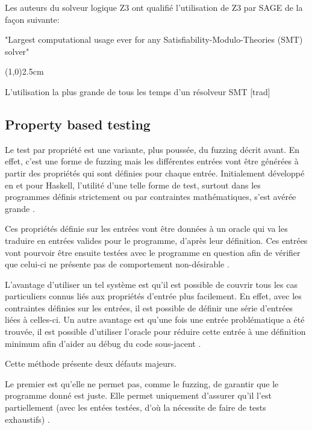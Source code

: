 \documentclass[a4paper]{report}
\begin{document}
Les auteurs du solveur logique Z3 ont qualifié l'utilisation de Z3 par SAGE de la façon suivante:
\begin{center}
"Largest computational usage ever for any Satisfiability-Modulo-Theories (SMT) solver" \cite{moura2008z3}\\
\begin{center}
\line(1,0){2.5cm}$ $ \\
\end{center}
L'utilisation la plus grande de tous les temps d'un résolveur SMT [trad] 
\end{center}

\subsection{Property based testing}

Le test par propriété est une variante, plus poussée, du fuzzing décrit avant.
En effet, c'est une forme de fuzzing mais les différentes entrées vont être générées à partir des propriétés qui sont définies pour chaque entrée.
Initialement développé en et pour Haskell, l'utilité d'une telle forme de test, surtout dans les programmes définis strictement ou par contraintes mathématiques, s'est avérée grande \cite{Paraskevopoulou2015}.

Ces propriétés définie sur les entrées vont être données à un oracle qui va les traduire en entrées valides pour le programme, d'après leur définition.
Ces entrées vont pourvoir être ensuite testées avec le programme en question afin de vérifier que celui-ci ne présente pas de comportement non-désirable \cite{Fink1997}.

L'avantage d'utiliser un tel système est qu'il est possible de couvrir tous les cas particuliers connus liés aux propriétés d'entrée plus facilement.
En effet, avec les contraintes définies sur les entrées, il est possible de définir une série d'entrées liées à celles-ci.
Un autre avantage est qu'une fois une entrée problématique a été trouvée, il est possible d'utiliser l'oracle pour réduire cette entrée à une définition minimum afin d'aider au débug du code sous-jacent \cite{Papadakis2011}.

Cette méthode présente deux défauts majeurs.

Le premier est qu'elle ne permet pas, comme le fuzzing, de garantir que le programme donné est juste.
Elle permet uniquement d'assurer qu'il l'est partiellement (avec les entées testées, d'où la nécessite de faire de tests exhaustifs) \cite{Papadakis2011}.
\end{document}
